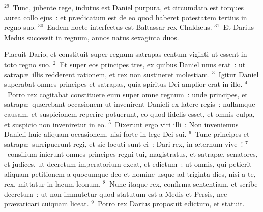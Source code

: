 ${}^{29}$~Tunc, jubente rege, indutus est Daniel purpura, et circumdata est torques aurea collo ejus~: et pr\ae dicatum est de eo quod haberet potestatem tertius in regno suo.
${}^{30}$~Eadem nocte interfectus est Baltassar rex Chald\ae us.
${}^{31}$~Et Darius Medus successit in regnum, annos natus sexaginta duos.

\lettrine[lines=10,image=true,loversize=0.05,lraise=-0.03]{P}{}lacuit Dario, et constituit super regnum satrapas centum viginti ut essent in toto regno suo.
${}^{2}$~Et super eos principes tres, ex quibus Daniel unus erat~: ut satrap\ae\ illis redderent rationem, et rex non sustineret molestiam.
${}^{3}$~Igitur Daniel superabat omnes principes et satrapas, quia spiritus Dei amplior erat in illo.
${}^{4}$~Porro rex cogitabat constituere eum super omne regnum~: unde principes, et satrap\ae\ qu\ae rebant occasionem ut invenirent Danieli ex latere regis~: nullamque causam, et suspicionem reperire potuerunt, eo quod fidelis esset, et omnis culpa, et suspicio non inveniretur in eo.
${}^{5}$~Dixerunt ergo viri illi~: Non inveniemus Danieli huic aliquam occasionem, nisi forte in lege Dei sui.
${}^{6}$~Tunc principes et satrap\ae\ surripuerunt regi, et sic locuti sunt ei~: Dari rex, in \ae ternum vive~!
${}^{7}$~consilium inierunt omnes principes regni tui, magistratus, et satrap\ae , senatores, et judices, ut decretum imperatorium exeat, et edictum~: ut omnis, qui petierit aliquam petitionem a quocumque deo et homine usque ad triginta dies, nisi a te, rex, mittatur in lacum leonum.
${}^{8}$~Nunc itaque rex, confirma sententiam, et scribe decretum~: ut non immutetur quod statutum est a Medis et Persis, nec pr\ae varicari cuiquam liceat.
${}^{9}$~Porro rex Darius proposuit edictum, et statuit.


